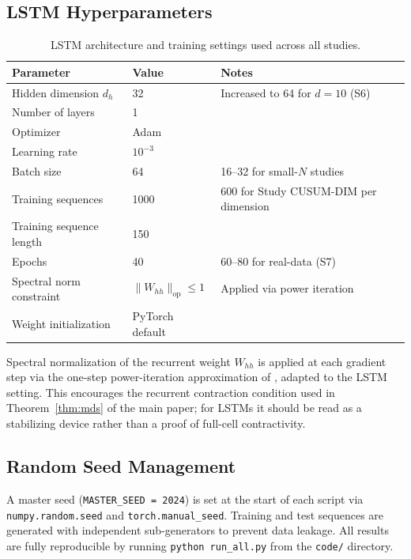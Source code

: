 \documentclass[bj,authoryear]{imsart}
\theoremstyle{plain}
\theoremstyle{definition}
\begin{document}
\subsection{LSTM Hyperparameters}

\begin{table}[h]
\centering
\caption{LSTM architecture and training settings used across all studies.}
\label{tab:hparam}
\small
\begin{tabular}{lll}
\toprule
Parameter & Value & Notes \\
\midrule
Hidden dimension $d_h$ & 32 & Increased to 64 for $d=10$ (S6) \\
Number of layers & 1 & \\
Optimizer & Adam & \citet{kingma2015adam} \\
Learning rate & $10^{-3}$ & \\
Batch size & 64 & 16--32 for small-$N$ studies \\
Training sequences & 1000 & 600 for Study CUSUM-DIM per dimension \\
Training sequence length & 150 & \\
Epochs & 40 & 60--80 for real-data (S7) \\
Spectral norm constraint & $\|W_{hh}\|_{\mathrm{op}} \leq 1$ & Applied via power iteration \\
Weight initialization & PyTorch default & \\
\bottomrule
\end{tabular}
\end{table}

Spectral normalization of the recurrent weight $W_{hh}$ is applied at each
gradient step via the one-step power-iteration approximation of
\citet{miyato2018spectral}, adapted to the LSTM setting.
This encourages the recurrent contraction condition used in
Theorem~\ref{thm:mds} of the main paper; for LSTMs it should be read as a stabilizing device rather than a proof of full-cell contractivity.

\subsection{Random Seed Management}

A master seed (\texttt{MASTER\_SEED = 2024}) is set at the start of each
script via \texttt{numpy.random.seed} and \texttt{torch.manual\_seed}.
Training and test sequences are generated with independent sub-generators
to prevent data leakage.
All results are fully reproducible by running \texttt{python run\_all.py}
from the \texttt{code/} directory.
\end{document}
